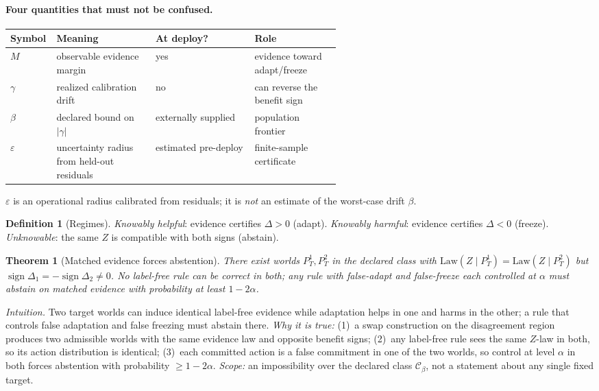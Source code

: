 \documentclass[conference]{IEEEtran}
\theoremstyle{plain}
\newtheorem{theorem}{Theorem}
\theoremstyle{definition}
\newtheorem{definition}{Definition}
\theoremstyle{remark}
\newcommand{\sign}{\operatorname{sign}}
\newcommand{\Law}{\mathrm{Law}}
\begin{document}
\paragraph{Four quantities that must not be confused.}
\begin{center}\footnotesize
\begin{tabular}{@{}lp{0.3\linewidth}lp{0.26\linewidth}@{}}
\toprule
Symbol & Meaning & At deploy? & Role \\
\midrule
$M$ & observable evidence margin & yes & evidence toward adapt/freeze \\
$\gamma$ & realized calibration drift & no & can reverse the benefit sign \\
$\beta$ & declared bound on $|\gamma|$ & externally supplied & population frontier \\
$\varepsilon$ & uncertainty radius from held-out residuals & estimated pre-deploy & finite-sample certificate \\
\bottomrule
\end{tabular}
\end{center}
\noindent $\varepsilon$ is an operational radius calibrated from residuals; it is \emph{not} an
estimate of the worst-case drift $\beta$.

\begin{definition}[Regimes]
\emph{Knowably helpful}: evidence certifies $\Delta>0$ (adapt).
\emph{Knowably harmful}: evidence certifies $\Delta<0$ (freeze).
\emph{Unknowable}: the same $Z$ is compatible with both signs (abstain).
\end{definition}

\begin{theorem}[Matched evidence forces abstention]\label{lem:nonid}
There exist worlds $P_T^1,P_T^2$ in the declared class with
$\Law(Z\mid P_T^1)=\Law(Z\mid P_T^2)$ but $\sign\Delta_1=-\sign\Delta_2\neq0$. No label-free rule
can be correct in both; any rule with false-adapt and false-freeze each controlled at $\alpha$
must abstain on matched evidence with probability at least $1-2\alpha$.
\end{theorem}

\noindent\emph{Intuition.} Two target worlds can induce identical label-free evidence while
adaptation helps in one and harms in the other; a rule that controls false adaptation and false
freezing must abstain there. \emph{Why it is true:} (1)~a swap construction on the disagreement
region produces two admissible worlds with the same evidence law and opposite benefit signs;
(2)~any label-free rule sees the same $Z$-law in both, so its action distribution is identical;
(3)~each committed action is a false commitment in one of the two worlds, so control at level
$\alpha$ in both forces abstention with probability $\ge1-2\alpha$. \emph{Scope:} an
impossibility over the declared class $\mathcal C_\beta$, not a statement about any single fixed
target.
\end{document}
